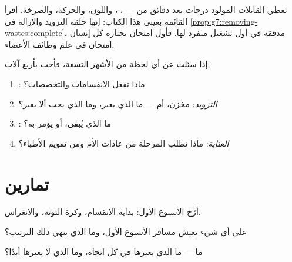 \begin{example}\label{ex:g8:from-egg-to-birth:audit}
تعطي القابلات المولود درجات بعد دقائق من  ---
، ، واللون، والحركة، والصرخة. اقرأ
القائمة بعيني هذا الكتاب: إنها حلقة التزويد والإزالة في
\cref{prop:g7:removing-wastes:complete}، مدققة في أول
تشغيل منفرد لها. فأول امتحان يجتازه كل إنسان امتحان في
علم وظائف الأعضاء.
\end{example}

\begin{method}\label{met:g8:from-egg-to-birth:explain}
إذا سئلت عن أي لحظة من الأشهر التسعة، فأجب بأربع
آلات:
\begin{enumerate}
  \item \emph{}: ماذا تفعل الانقسامات والتخصصات؟
  \item \emph{التزويد}: مخزن، أم  --- ما الذي يعبر،
        وما الذي يجب ألا يعبر؟
  \item \emph{}: ما الذي يُبقى، أو يؤمر به؟
  \item \emph{العناية}: ماذا تطلب المرحلة من عادات الأم
        ومن تقويم الأطباء؟
\end{enumerate}
\end{method}

\section{تمارين}

\begin{exercise}[$\star$]\label{exo:g8:from-egg-to-birth:1}
أرّخ الأسبوع الأول: بداية الانقسام، وكرة التوتة،
والانغراس.
\end{exercise}

\begin{exercise}[$\star$]\label{exo:g8:from-egg-to-birth:2}
على أي شيء يعيش مسافر الأسبوع الأول، وما الذي ينهي ذلك
الترتيب؟
\end{exercise}

\begin{exercise}[$\star$]\label{exo:g8:from-egg-to-birth:3}
ما  --- ما الذي يعبرها في كل اتجاه، وما الذي لا
يعبرها أبدًا؟
\end{exercise}

